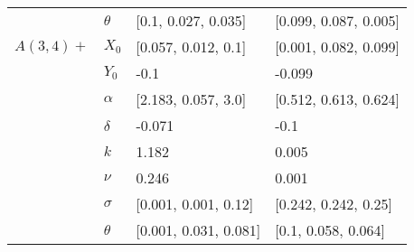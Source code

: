 \begin{tabular}{llll}
	& $\theta$ &    [0.1, 0.027, 0.035] &  [0.099, 0.087, 0.005] \\
	$A(3, 4)+$ & $X_0$ &    [0.057, 0.012, 0.1] &  [0.001, 0.082, 0.099] \\
	& $Y_0$ &                   -0.1 &                 -0.099 \\
	& $\alpha$ &    [2.183, 0.057, 3.0] &  [0.512, 0.613, 0.624] \\
	& $\delta$ &                 -0.071 &                   -0.1 \\
	& $k$ &                  1.182 &                  0.005 \\
	& $\nu$ &                  0.246 &                  0.001 \\
	& $\sigma$ &   [0.001, 0.001, 0.12] &   [0.242, 0.242, 0.25] \\
	& $\theta$ &  [0.001, 0.031, 0.081] &    [0.1, 0.058, 0.064] \\
	\bottomrule
\end{tabular}

